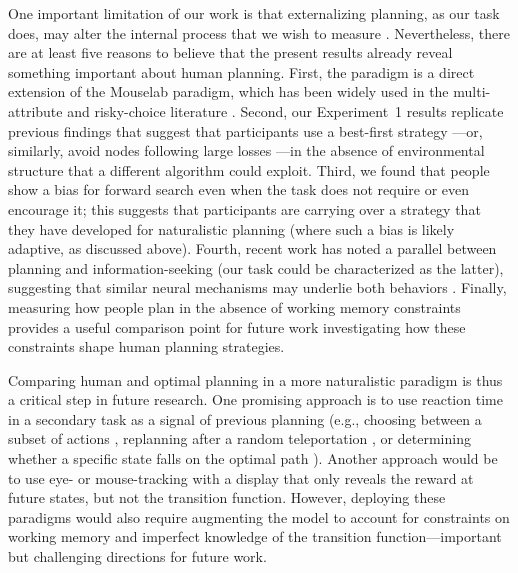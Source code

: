 One important limitation of our work is that externalizing planning, as our task does, may alter the internal process that we wish to measure \citep{lohse1996comparison}. Nevertheless, there are at least five reasons to believe that the present results already reveal something important about human planning. First, the paradigm is a direct extension of the Mouselab paradigm, which has been widely used in the multi-attribute and risky-choice literature \citep{payne1988adaptive,ford1989process,payne1993adaptive,gabaix2006costly,schulte-mecklenbeck2011visiting}. Second, our Experiment~1 results replicate previous findings that suggest that participants use a best-first strategy \citep{vanopheusden2017computational}---or, similarly, avoid nodes following large losses \citep{huys2012bonsai}---in the absence of environmental structure that a different algorithm could exploit. Third, we found that people show a bias for forward search even when the task does not require or even encourage it; this suggests that participants are carrying over a strategy that they have developed for naturalistic planning (where such a bias is likely adaptive, as discussed above). Fourth, recent work has noted a parallel between planning and information-seeking (our task could be characterized as the latter), suggesting that similar neural mechanisms may underlie both behaviors \citep{hunt2021formalizing}. Finally, measuring how people plan in the absence of working memory constraints provides a useful comparison point for future work investigating how these constraints shape human planning strategies.

Comparing human and optimal planning in a more naturalistic paradigm is thus a critical step in future research. One promising approach is to use reaction time in a secondary task as a signal of previous planning (e.g., choosing between a subset of actions \citealp{ongchoco2019imagining}, replanning after a random teleportation \citealp{ho2020efficiency}, or determining whether a specific state falls on the optimal path \citealp{solway2014optimal}). Another approach would be to use eye- or mouse-tracking with a display that only reveals the reward at future states, but not the transition function. However, deploying these paradigms would also require augmenting the model to account for constraints on working memory and imperfect knowledge of the transition function---important but challenging directions for future work.

